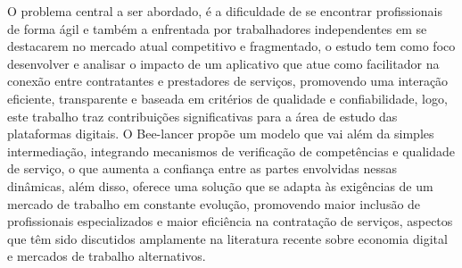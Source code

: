 O problema central a ser abordado, é a dificuldade de se encontrar profissionais de forma ágil e também a enfrentada por trabalhadores independentes em se destacarem no mercado atual competitivo e fragmentado, o estudo tem como foco desenvolver e analisar o impacto de um aplicativo que atue como facilitador na conexão entre contratantes e prestadores de serviços, promovendo uma interação eficiente, transparente e baseada em critérios de qualidade e confiabilidade, logo, este trabalho traz contribuições significativas para a área de estudo das plataformas digitais. O Bee-lancer propõe um modelo que vai além da simples intermediação, integrando mecanismos de verificação de competências e qualidade de serviço, o que aumenta a confiança entre as partes envolvidas nessas dinâmicas, além disso, oferece uma solução que se adapta às exigências de um mercado de trabalho em constante evolução, promovendo maior inclusão de profissionais especializados e maior eficiência na contratação de serviços, aspectos que têm sido discutidos amplamente na literatura recente sobre economia digital e mercados de trabalho alternativos.\\